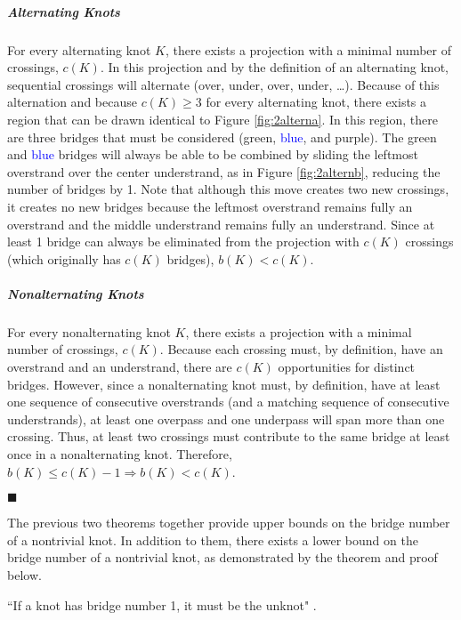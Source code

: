 \documentclass[titlepage,11pt]{article}
\newcommand{\dq}[4][]{``#2"#1 \cite[#4]{#3}.}
\newcommand{\qed}{
    \begin{flushright}
        $\blacksquare$
    \end{flushright}
}
\begin{document}
\subparagraph{\textbf{Alternating Knots}} For every alternating knot $K$, there exists a projection with a minimal number of crossings, $c(K)$. In this projection and by the definition of an alternating knot, sequential crossings will alternate (over, under, over, under, \dots). Because of this alternation and because $c(K)\geq 3$ for every alternating knot, there exists a region that can be drawn identical to Figure \ref{fig:2alterna}. In this region, there are three bridges that must be considered (\textcolor{grx}{green}, \textcolor{blue}{blue}, and \textcolor{pux}{purple}). The \textcolor{grx}{green} and \textcolor{blue}{blue} bridges will always be able to be combined by sliding the leftmost overstrand over the center understrand, as in Figure \ref{fig:2alternb}, reducing the number of bridges by 1. Note that although this move creates two new crossings, it creates no new bridges because the leftmost overstrand remains fully an overstrand and the middle understrand remains fully an understrand. Since at least 1 bridge can always be eliminated from the projection with $c(K)$ crossings (which originally has $c(K)$ bridges), $b(K)<c(K)$.
\subparagraph{\textbf{Nonalternating Knots}} For every nonalternating knot $K$, there exists a projection with a minimal number of crossings, $c(K)$. Because each crossing must, by definition, have an overstrand and an understrand, there are $c(K)$ opportunities for distinct bridges. However, since a nonalternating knot must, by definition, have at least one sequence of consecutive overstrands (and a matching sequence of consecutive understrands), at least one overpass and one underpass will span more than one crossing. Thus, at least two crossings must contribute to the same bridge at least once in a nonalternating knot. Therefore, $b(K)\leq c(K)-1\Rightarrow b(K)<c(K)$.
\qed

The previous two theorems together provide upper bounds on the bridge number of a nontrivial knot. In addition to them, there exists a lower bound on the bridge number of a nontrivial knot, as demonstrated by the theorem and proof below.

\begin{theor}
    \dq{If a knot has bridge number 1, it must be the unknot}{bib:knotbook}{65}
\end{theor}
\end{document}
